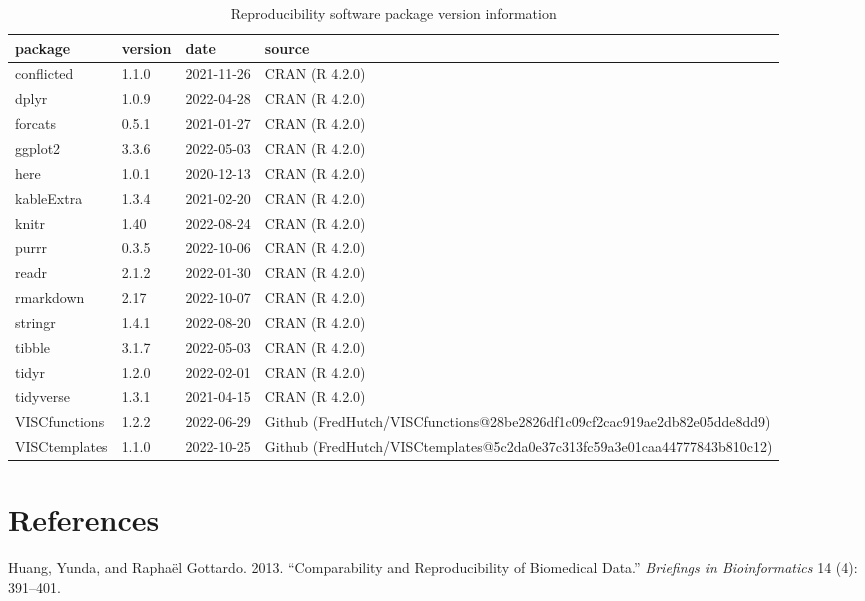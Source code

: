 \documentclass[11pt]{article}
\newlength{\cslhangindent}
\newenvironment{CSLReferences}[2] %
 {%
  \setlength{\parindent}{0pt}
  \ifodd #1 \everypar{\setlength{\hangindent}{\cslhangindent}}\ignorespaces\fi
  \ifnum #2 > 0
  \setlength{\parskip}{#2\baselineskip}
  \fi
 }%
 {}
\begin{document}
\begin{table}

\caption{\label{tab:Software-Package-Version-Information}Reproducibility software package version information}
\centering
\fontsize{10}{12}\selectfont
\begin{tabular}[t]{llll}
\toprule
package & version & date & source\\
\midrule
conflicted & 1.1.0 & 2021-11-26 & CRAN (R 4.2.0)\\
dplyr & 1.0.9 & 2022-04-28 & CRAN (R 4.2.0)\\
forcats & 0.5.1 & 2021-01-27 & CRAN (R 4.2.0)\\
ggplot2 & 3.3.6 & 2022-05-03 & CRAN (R 4.2.0)\\
here & 1.0.1 & 2020-12-13 & CRAN (R 4.2.0)\\
kableExtra & 1.3.4 & 2021-02-20 & CRAN (R 4.2.0)\\
knitr & 1.40 & 2022-08-24 & CRAN (R 4.2.0)\\
purrr & 0.3.5 & 2022-10-06 & CRAN (R 4.2.0)\\
readr & 2.1.2 & 2022-01-30 & CRAN (R 4.2.0)\\
rmarkdown & 2.17 & 2022-10-07 & CRAN (R 4.2.0)\\
stringr & 1.4.1 & 2022-08-20 & CRAN (R 4.2.0)\\
tibble & 3.1.7 & 2022-05-03 & CRAN (R 4.2.0)\\
tidyr & 1.2.0 & 2022-02-01 & CRAN (R 4.2.0)\\
tidyverse & 1.3.1 & 2021-04-15 & CRAN (R 4.2.0)\\
VISCfunctions & 1.2.2 & 2022-06-29 & Github (FredHutch/VISCfunctions@28be2826df1c09cf2cac919ae2db82e05dde8dd9)\\
VISCtemplates & 1.1.0 & 2022-10-25 & Github (FredHutch/VISCtemplates@5c2da0e37c313fc59a3e01caa44777843b810c12)\\
\bottomrule
\end{tabular}
\end{table}

\clearpage

\hypertarget{references}{%
\section*{References}\label{references}}

\hypertarget{refs}{}
\begin{CSLReferences}{1}{0}
\leavevmode{}%
Huang, Yunda, and Raphaël Gottardo. 2013. {``Comparability and Reproducibility of Biomedical Data.''} \emph{Briefings in Bioinformatics} 14 (4): 391--401.

\end{CSLReferences}
\label{LastPageOfBackMatter}~
\end{document}
